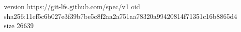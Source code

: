 version https://git-lfs.github.com/spec/v1
oid sha256:11ef5c6b027e3f39b7be5c8f2aa2a751aa78320a99420814f71351c16b8865d4
size 26639
